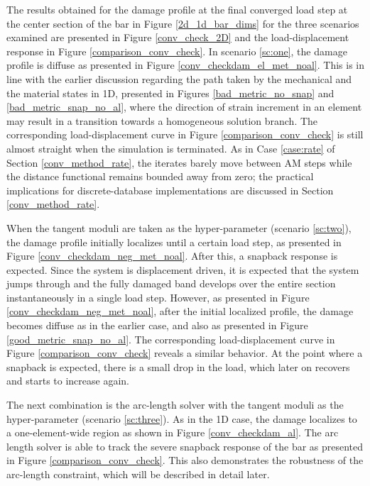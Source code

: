 \documentclass[10pt,review]{cas-sc}
\begin{document}
The results obtained for the damage profile at the final converged load step at the center section of the bar in Figure \ref{2d_1d_bar_dims} for the three scenarios examined are presented in Figure \ref{conv_check_2D} and the load-displacement response in Figure \ref{comparison_conv_check}. In scenario \ref{sc:one}, the damage profile is diffuse as presented in Figure \ref{conv_checkdam_el_met_noal}. This is in line with the earlier discussion regarding the path taken by the mechanical and the material states in 1D, presented in Figures \ref{bad_metric_no_snap} and \ref{bad_metric_snap_no_al}, where the direction of strain increment in an element may result in a transition towards a homogeneous solution branch. The corresponding load-displacement curve in Figure \ref{comparison_conv_check} is still almost straight when the simulation is terminated. As in Case \ref{case:rate} of Section \ref{conv_method_rate}, the iterates barely move between AM steps while the distance functional remains bounded away from zero; the practical implications for discrete-database implementations are discussed in Section \ref{conv_method_rate}.

When the tangent moduli are taken as the hyper-parameter (scenario \ref{sc:two}), the damage profile initially localizes until a certain load step, as presented in Figure \ref{conv_checkdam_neg_met_noal}. After this, a snapback response is expected. Since the system is displacement driven, it is expected that the system jumps through and the fully damaged band develops over the entire section instantaneously in a single load step. However, as presented in Figure \ref{conv_checkdam_neg_met_noal}, after the initial localized profile, the damage becomes diffuse as in the earlier case, and also as presented in Figure \ref{good_metric_snap_no_al}. The corresponding load-displacement curve in Figure \ref{comparison_conv_check} reveals a similar behavior. At the point where a snapback is expected, there is a small drop in the load, which later on recovers and starts to increase again. 

The next combination is the arc-length solver with the tangent moduli as the hyper-parameter (scenario \ref{sc:three}). As in the 1D case, the damage localizes to a one-element-wide region as shown in Figure \ref{conv_checkdam_al}. The arc length solver is able to track the severe snapback response of the bar as presented in Figure \ref{comparison_conv_check}. This also demonstrates the robustness of the arc-length constraint, which will be described in detail later.
\end{document}
